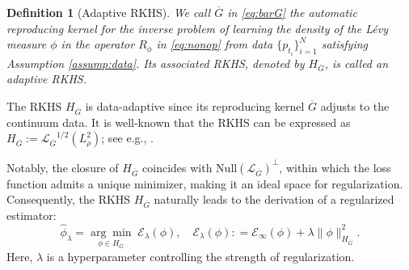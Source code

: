 \documentclass[12pt]{article}
\def\Gbar{ {\overline{G}} }
\def\LGbar{ {\mathcal{L}_{\overline{G}}}  }
\newcommand{\argmin}[1]{\underset{#1}{\operatorname{arg}\operatorname{min}}\;}
\newtheorem{definition}[theorem]{Definition}
\numberwithin{equation}{section}
\numberwithin{theorem}{section}
\begin{document}
\begin{definition}[Adaptive RKHS] \label{def:auto-kernel}
We call $\Gbar$ in \eqref{eq:barG} the \emph{automatic reproducing kernel} for the inverse problem of learning the density of the L\'evy measure $\phi$ in the operator $R_{\phi}$ in \eqref{eq:nonop} from data $\{p_{t_i}\}_{i=1}^N$ satisfying {\rm Assumption \ref{assump:data}}.  Its associated RKHS, denoted by $H_{\Gbar}$, is called an adaptive RKHS. 
 \end{definition}
 The RKHS $H_{\Gbar}$ is data-adaptive since its reproducing kernel $\Gbar$ adjusts to the continuum data. It is well-known that the RKHS can be expressed as $H_{\Gbar}:=\LGbar^{1/2}(L^2_\rho)$; see e.g., \cite{cucker2007learning,lu2022data,zhang2025minimax}. 
 
 
 Notably, the closure of $H_{\Gbar}$ coincides with $\mathrm{Null}(\LGbar)^\perp$, within which the loss function admits a unique minimizer, making it an ideal space for regularization. Consequently, the RKHS $H_{\Gbar}$ naturally leads to the derivation of a regularized estimator: 
\begin{equation}
\label{eq:wholeloss}
\widehat{\phi}_\lambda =\argmin{\phi \in H_{\Gbar}}   \mathcal{E}_\lambda(\phi), \quad 
\mathcal{E}_\lambda(\phi): =\mathcal{E}_\infty(\phi) +\lambda \|\phi\|_{H_{\Gbar}}^2. 
\end{equation}
Here, $\lambda$ is a hyperparameter controlling the strength of regularization.  
\end{document}
